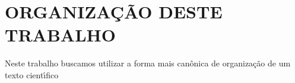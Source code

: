 \documentclass[
12pt,		%
openright,	%
twoside,  %
a4paper,			%
chapter=TITLE,		%
english,			%
french,				%
spanish,			%
brazil				%
]{USPSC-classe/USPSC}
\begin{document}

%








%




\listoffigures*
\cleardoublepage

\listoftables*
\cleardoublepage

\listofquadro*
\cleardoublepage




\tableofcontents*
\cleardoublepage
\textual

\chapter[ORGANIZA\c{C}\~AO DESTE TRABALHO]{ORGANIZA\c{C}\~AO DESTE TRABALHO}\label{ORGANIZA\c{C}\~AO DESTE TRABALHO}
Neste trabalho buscamos utilizar a forma mais can\^onica de organiza\c{c}\~ao de um texto cient\'{\i}fico
\end{document}
